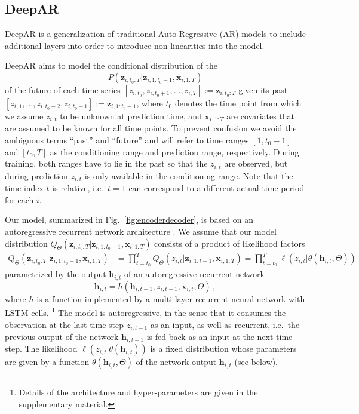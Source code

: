 \documentclass{article}
\newcommand{\z}[2]{z_{#1, #2}}
\newcommand{\xbf}{\mathbf{x}}
\newcommand{\zVec}[3]{\mathbf{z}_{#1, #2:#3}}
\newcommand{\xVec}[3]{\mathbf{x}_{#1, #2:#3}}
\newcommand{\hVec}{\mathbf{h}}
\begin{document}
\subsection{DeepAR}
DeepAR is a generalization of traditional Auto Regressive (AR) models to include additional layers into order to introduce non-linearities into the model.


DeepAR aims to model the conditional distribution of the 
\begin{equation*}
P(\zVec{i}{t_0}{T} | \zVec{i}{1}{t_0-1}, \xVec{i}{1}{T})
\label{eq:condDist}
\end{equation*}
of the future of each time series $[\z{i}{t_0}, \z{i}{t_0 + 1}, \ldots, \z{i}{T}] := \zVec{i}{t_0}{T}$ given its \hbox{past $[\z{i}{1}, \ldots, \z{i}{t_0-2}, \z{i}{t_0-1}] := \zVec{i}{1}{t_0-1}$}, where $t_0$ denotes the time point from which we assume $\z{i}{t}$ to be unknown at prediction time, and $\xVec{i}{1}{T}$ are covariates that are assumed to be known for all time points. To prevent confusion we avoid the ambiguous terms ``past'' and ``future'' and will refer to time ranges $[1, t_0-1]$ and $[t_0, T]$ as the conditioning range and 
prediction range, respectively. During training, both ranges have to lie in the past so that the $\z{i}{t}$ are observed, but during prediction $\z{i}{t}$ is only available in the conditioning range. Note that the time index $t$ is relative, i.e.\ $t=1$ can correspond to a different actual time period for each $i$. 

\newcommand{\modelDist}{Q_\Theta(\zVec{i}{t_0}{T} | \zVec{i}{1}{t_0-1}, \xVec{i}{1}{T})}

Our model, summarized in Fig.~\ref{fig:encoderdecoder}, is based on an autoregressive recurrent network architecture \cite{graves2013,sutskever2014}.
We assume that our model distribution $\modelDist$ consists of a product of likelihood factors
\begin{align*}
\modelDist &= \prod\nolimits_{t=t_0}^T Q_\Theta(z_{i,t}|\mathbf{z}_{i,1:t-1}, \xVec{i}{1}{T}) = \prod\nolimits_{t=t_0}^T \ell(\z{i}{t} | \theta(\hVec_{i, t}, \Theta))
\end{align*}
parametrized by the output $\hVec_{i, t}$ of an autoregressive recurrent network
\begin{equation}
\hVec_{i, t} = h\left(\hVec_{i, t-1}, \z{i}{t-1}, \xbf_{i, t}, \Theta\right) \,,
\label{eq:recurrence}
\end{equation}
where $h$ is a function implemented by a multi-layer recurrent neural network with LSTM cells.%
\footnote{Details of the architecture and hyper-parameters are given in the supplementary material.}
The model is autoregressive, in the sense that it consumes the observation at the last time step $\z{i}{t-1}$ as an input,
as well as recurrent, i.e.\ the previous output of the network $\hVec_{i,t-1}$ is fed back as an input at the next time step.
The likelihood $\ell(\z{i}{t}|\theta(\hVec_{i,t}))$ is a fixed distribution
whose parameters are given by a function $\theta(\hVec_{i,t}, \Theta)$ of the network output $\hVec_{i, t}$ (see below).
\end{document}
